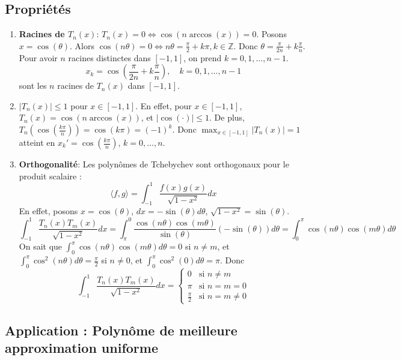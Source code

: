 \documentclass[oneside]{book}
\begin{document}
\subsection{Propriétés}

\begin{enumerate}
    \item \textbf{Racines de $T_n(x)$}:
    $T_n(x) = 0 \Leftrightarrow \cos(n \arccos(x)) = 0$.
    Posons $x = \cos(\theta)$. Alors $\cos(n\theta) = 0 \Leftrightarrow n\theta = \frac{\pi}{2} + k\pi, k \in \mathbb{Z}$.
    Donc $\theta = \frac{\pi}{2n} + k\frac{\pi}{n}$.
    Pour avoir $n$ racines distinctes dans $[-1, 1]$, on prend $k = 0, 1, \dots, n-1$.
    \[
    x_k = \cos\left(\frac{\pi}{2n} + k\frac{\pi}{n}\right), \quad k = 0, 1, \dots, n-1
    \]
    sont les $n$ racines de $T_n(x)$ dans $[-1, 1]$.

    \item $|T_n(x)| \leq 1$ pour $x \in [-1, 1]$.
    En effet, pour $x \in [-1, 1]$, $T_n(x) = \cos(n \arccos(x))$, et $|\cos(\cdot)| \leq 1$.
    De plus, $T_n(\cos(\frac{k\pi}{n})) = \cos(k\pi) = (-1)^k$.
    Donc $\max_{x \in [-1, 1]} |T_n(x)| = 1$ atteint en $x_k' = \cos(\frac{k\pi}{n})$, $k = 0, \dots, n$.

    \item \textbf{Orthogonalité}:
    Les polynômes de Tchebychev sont orthogonaux pour le produit scalaire :
    \[
    \langle f, g \rangle = \int_{-1}^{1} \frac{f(x)g(x)}{\sqrt{1-x^2}} dx
    \]
    En effet, posons $x = \cos(\theta)$, $dx = -\sin(\theta) d\theta$, $\sqrt{1-x^2} = \sin(\theta)$.
    \[
    \int_{-1}^{1} \frac{T_n(x)T_m(x)}{\sqrt{1-x^2}} dx = \int_{\pi}^{0} \frac{\cos(n\theta)\cos(m\theta)}{\sin(\theta)} (-\sin(\theta)) d\theta = \int_{0}^{\pi} \cos(n\theta)\cos(m\theta) d\theta
    \]
    On sait que $\int_{0}^{\pi} \cos(n\theta)\cos(m\theta) d\theta = 0$ si $n \neq m$, et $\int_{0}^{\pi} \cos^2(n\theta) d\theta = \frac{\pi}{2}$ si $n \neq 0$, et $\int_{0}^{\pi} \cos^2(0) d\theta = \pi$.
    Donc
    \[
    \int_{-1}^{1} \frac{T_n(x)T_m(x)}{\sqrt{1-x^2}} dx =
    \begin{cases}
        0 & \text{si } n \neq m \\
        \pi & \text{si } n = m = 0 \\
        \frac{\pi}{2} & \text{si } n = m \neq 0
    \end{cases}
    \]
\end{enumerate}

\subsection{Application : Polynôme de meilleure approximation uniforme}
\end{document}
